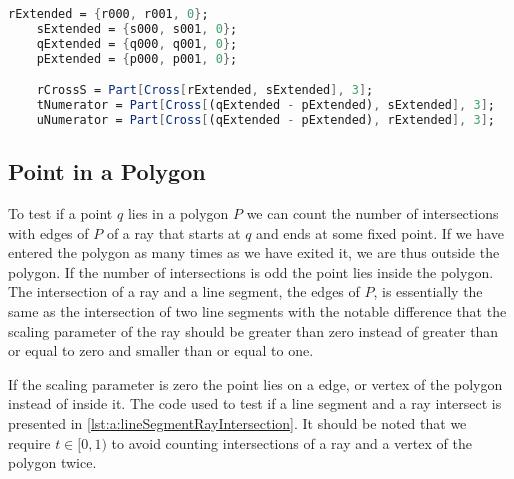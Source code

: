 	\begin{lstlisting}[float, language=Mathematica, label={lst:a:lineSegmentIntersectionMat}, caption={Mathematica code used to compute the value of \t{r_cross_s}, \t{u_numerator} and \t{t_numerator}.}]
	rExtended = {r000, r001, 0};
	sExtended = {s000, s001, 0};
	qExtended = {q000, q001, 0};
	pExtended = {p000, p001, 0};

	rCrossS = Part[Cross[rExtended, sExtended], 3];
	tNumerator = Part[Cross[(qExtended - pExtended), sExtended], 3];
	uNumerator = Part[Cross[(qExtended - pExtended), rExtended], 3];
	\end{lstlisting}

	

\subsection{Point in a Polygon}
	To test if a point $q$ lies in a polygon $P$ we can count the number of intersections with edges of $P$ of a ray that starts at $q$ and ends at some fixed point. If we have entered the polygon as many times as we have exited it, we are thus outside the polygon. If the number of intersections is odd the point lies inside the polygon. \\

	The intersection of a ray and a line segment, the edges of $P$, is essentially the same as the intersection of two line segments with the notable difference that the scaling parameter of the ray should be greater than zero instead of greater than or equal to zero and smaller than or equal to one. 

	If the scaling parameter is zero the point lies on a edge, or vertex of the polygon instead of inside it. The code used to test if a line segment and a ray intersect is presented in \autoref{lst:a:lineSegmentRayIntersection}. It should be noted that we require $t \in [0, 1)$ to avoid counting intersections of a ray and a vertex of the polygon twice.\\

	

